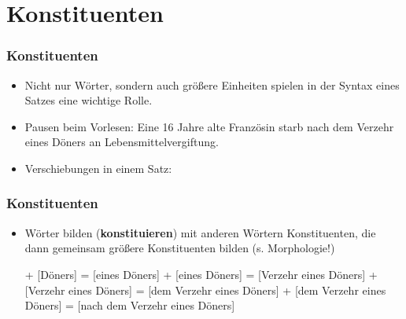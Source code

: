 \section{Konstituenten}


\begin{frame}
\frametitle{Konstituenten}

\begin{itemize}
	\item Nicht nur Wörter, sondern auch größere Einheiten spielen in der Syntax eines Satzes eine wichtige Rolle.
	\item Pausen beim Vorlesen:
	\ea Eine 16 Jahre alte Französin starb nach dem Verzehr eines Döners an Lebensmittelvergiftung.
	\z
	
\pause	
	\item Verschiebungen in einem Satz:
	\eal 
	\zl


\end{itemize}

\end{frame}


\begin{frame}
\frametitle{Konstituenten}

\begin{itemize}
	\item Wörter bilden (\textbf{konstituieren}) mit anderen Wörtern Konstituenten, die dann gemeinsam größere Konstituenten bilden (s. Morphologie!)
	
	\eal
	\ex [eines] + [Döners] = [eines Döners]
\pause	
	\ex [Verzehr] + [eines Döners] = [Verzehr eines Döners]
\pause
	\ex [dem] + [Verzehr eines Döners] = [dem Verzehr eines Döners]
\pause
	\ex [nach] + [dem Verzehr eines Döners] = [nach dem Verzehr eines Döners]
	\zl

\end{itemize}

\end{frame}


